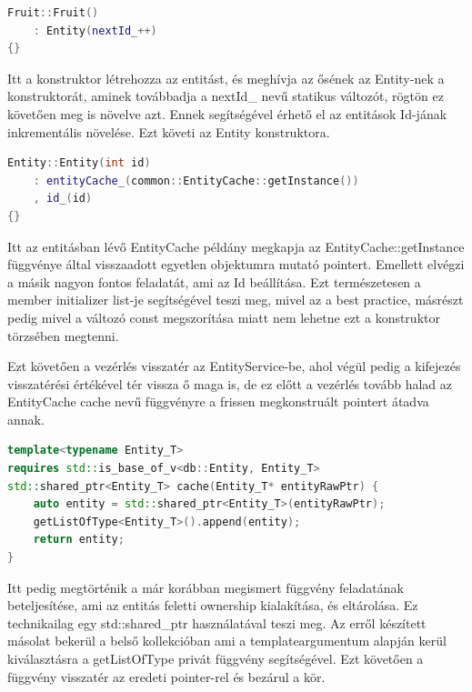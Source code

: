 \begin{lstlisting}[language={C++}]
Fruit::Fruit()
    : Entity(nextId_++)
{}
\end{lstlisting}

Itt a konstruktor létrehozza az entitást, és meghívja az ősének az Entity-nek a konstruktorát, aminek továbbadja a nextId\_ nevű statikus változót, rögtön ez követően meg is növelve azt. Ennek segítségével érhető el az entitások Id-jának inkrementális növelése. Ezt követi az Entity konstruktora.

\begin{lstlisting}[language={C++}]
Entity::Entity(int id)
    : entityCache_(common::EntityCache::getInstance())
    , id_(id)
{}
\end{lstlisting}

Itt az entitásban lévő EntityCache példány megkapja az EntityCache::getInstance függvénye által visszaadott egyetlen objektumra mutató pointert. Emellett elvégzi a másik nagyon fontos feladatát, ami az Id beállítása. Ezt természetesen a member initializer list-je segítségével teszi meg, mivel az a best practice, másrészt pedig mivel a változó const megszorítása miatt nem lehetne ezt a konstruktor törzsében megtenni.

Ezt követően a vezérlés visszatér az EntityService-be, ahol végül pedig a kifejezés visszatérési értékével tér vissza ő maga is, de ez előtt a vezérlés tovább halad az EntityCache cache nevű függvényre a frissen megkonstruált pointert átadva annak.

\begin{lstlisting}[language={C++}]
template<typename Entity_T>
requires std::is_base_of_v<db::Entity, Entity_T>
std::shared_ptr<Entity_T> cache(Entity_T* entityRawPtr) {
    auto entity = std::shared_ptr<Entity_T>(entityRawPtr);
    getListOfType<Entity_T>().append(entity);
    return entity;
}
\end{lstlisting}

Itt pedig megtörténik a már korábban megismert függvény feladatának beteljesítése, ami az entitás feletti ownership kialakítása, és eltárolása. Ez technikailag egy std::shared\_ptr használatával teszi meg. Az erről készített másolat bekerül a belső kollekcióban ami a templateargumentum alapján kerül kiválasztásra a getListOfType privát függvény segítségével. Ezt követően a függvény visszatér az eredeti pointer-rel és bezárul a kör.

